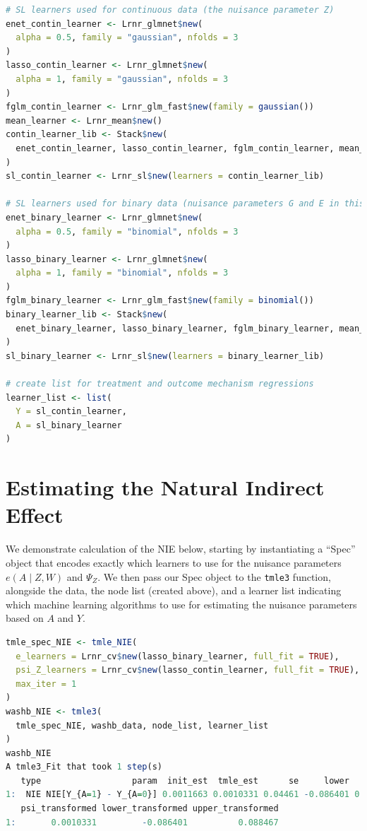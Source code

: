 \documentclass[12pt, krantz2,]{krantz}
\newcommand{\passthrough}[1]{#1}
\theoremstyle{definition}
\theoremstyle{definition}
\theoremstyle{definition}
\newcommand{\1}{\mathbbm{1}}
\begin{document}
\begin{lstlisting}[language=R]
# SL learners used for continuous data (the nuisance parameter Z)
enet_contin_learner <- Lrnr_glmnet$new(
  alpha = 0.5, family = "gaussian", nfolds = 3
)
lasso_contin_learner <- Lrnr_glmnet$new(
  alpha = 1, family = "gaussian", nfolds = 3
)
fglm_contin_learner <- Lrnr_glm_fast$new(family = gaussian())
mean_learner <- Lrnr_mean$new()
contin_learner_lib <- Stack$new(
  enet_contin_learner, lasso_contin_learner, fglm_contin_learner, mean_learner
)
sl_contin_learner <- Lrnr_sl$new(learners = contin_learner_lib)

# SL learners used for binary data (nuisance parameters G and E in this case)
enet_binary_learner <- Lrnr_glmnet$new(
  alpha = 0.5, family = "binomial", nfolds = 3
)
lasso_binary_learner <- Lrnr_glmnet$new(
  alpha = 1, family = "binomial", nfolds = 3
)
fglm_binary_learner <- Lrnr_glm_fast$new(family = binomial())
binary_learner_lib <- Stack$new(
  enet_binary_learner, lasso_binary_learner, fglm_binary_learner, mean_learner
)
sl_binary_learner <- Lrnr_sl$new(learners = binary_learner_lib)

# create list for treatment and outcome mechanism regressions
learner_list <- list(
  Y = sl_contin_learner,
  A = sl_binary_learner
)
\end{lstlisting}

\hypertarget{estimating-the-natural-indirect-effect}{%
\section{Estimating the Natural Indirect Effect}\label{estimating-the-natural-indirect-effect}}

We demonstrate calculation of the NIE below, starting by instantiating a ``Spec''
object that encodes exactly which learners to use for the nuisance parameters
\(e(A \mid Z, W)\) and \(\Psi_Z\). We then pass our Spec object to the \passthrough{\lstinline!tmle3!}
function, alongside the data, the node list (created above), and a learner list
indicating which machine learning algorithms to use for estimating the nuisance
parameters based on \(A\) and \(Y\).

\begin{lstlisting}[language=R]
tmle_spec_NIE <- tmle_NIE(
  e_learners = Lrnr_cv$new(lasso_binary_learner, full_fit = TRUE),
  psi_Z_learners = Lrnr_cv$new(lasso_contin_learner, full_fit = TRUE),
  max_iter = 1
)
washb_NIE <- tmle3(
  tmle_spec_NIE, washb_data, node_list, learner_list
)
washb_NIE
A tmle3_Fit that took 1 step(s)
   type                  param  init_est  tmle_est      se     lower    upper
1:  NIE NIE[Y_{A=1} - Y_{A=0}] 0.0011663 0.0010331 0.04461 -0.086401 0.088467
   psi_transformed lower_transformed upper_transformed
1:       0.0010331         -0.086401          0.088467
\end{lstlisting}
\end{document}
